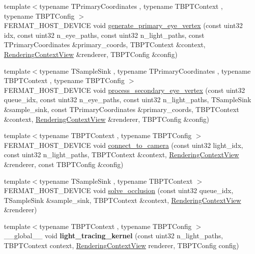\begin{DoxyCompactItemize}
\item 
{\footnotesize template$<$typename T\+Primary\+Coordinates , typename T\+B\+P\+T\+Context , typename T\+B\+P\+T\+Config $>$ }\\F\+E\+R\+M\+A\+T\+\_\+\+H\+O\+S\+T\+\_\+\+D\+E\+V\+I\+CE void \hyperlink{group___b_p_t_lib_core_gad13a8364b017ae28c4732ffd7eab9a65}{generate\+\_\+primary\+\_\+eye\+\_\+vertex} (const uint32 idx, const uint32 n\+\_\+eye\+\_\+paths, const uint32 n\+\_\+light\+\_\+paths, const T\+Primary\+Coordinates \&primary\+\_\+coords, T\+B\+P\+T\+Context \&context, \hyperlink{struct_rendering_context_view}{Rendering\+Context\+View} \&renderer, T\+B\+P\+T\+Config \&config)
\item 
{\footnotesize template$<$typename T\+Sample\+Sink , typename T\+Primary\+Coordinates , typename T\+B\+P\+T\+Context , typename T\+B\+P\+T\+Config $>$ }\\F\+E\+R\+M\+A\+T\+\_\+\+H\+O\+S\+T\+\_\+\+D\+E\+V\+I\+CE void \hyperlink{group___b_p_t_lib_core_ga560956a804364f64f0cf35d2d0c07124}{process\+\_\+secondary\+\_\+eye\+\_\+vertex} (const uint32 queue\+\_\+idx, const uint32 n\+\_\+eye\+\_\+paths, const uint32 n\+\_\+light\+\_\+paths, T\+Sample\+Sink \&sample\+\_\+sink, const T\+Primary\+Coordinates \&primary\+\_\+coords, T\+B\+P\+T\+Context \&context, \hyperlink{struct_rendering_context_view}{Rendering\+Context\+View} \&renderer, T\+B\+P\+T\+Config \&config)
\item 
{\footnotesize template$<$typename T\+B\+P\+T\+Context , typename T\+B\+P\+T\+Config $>$ }\\F\+E\+R\+M\+A\+T\+\_\+\+H\+O\+S\+T\+\_\+\+D\+E\+V\+I\+CE void \hyperlink{group___b_p_t_lib_core_gaf85f457b11ee79f45371b8afe928cabe}{connect\+\_\+to\+\_\+camera} (const uint32 light\+\_\+idx, const uint32 n\+\_\+light\+\_\+paths, T\+B\+P\+T\+Context \&context, \hyperlink{struct_rendering_context_view}{Rendering\+Context\+View} \&renderer, const T\+B\+P\+T\+Config \&config)
\item 
{\footnotesize template$<$typename T\+Sample\+Sink , typename T\+B\+P\+T\+Context $>$ }\\F\+E\+R\+M\+A\+T\+\_\+\+H\+O\+S\+T\+\_\+\+D\+E\+V\+I\+CE void \hyperlink{group___b_p_t_lib_core_ga588188b86e2afbe1f62d1bdd7a145cbf}{solve\+\_\+occlusion} (const uint32 queue\+\_\+idx, T\+Sample\+Sink \&sample\+\_\+sink, T\+B\+P\+T\+Context \&context, \hyperlink{struct_rendering_context_view}{Rendering\+Context\+View} \&renderer)
\item 
{\footnotesize template$<$typename T\+B\+P\+T\+Context , typename T\+B\+P\+T\+Config $>$ }\\\+\_\+\+\_\+global\+\_\+\+\_\+ void {\bfseries light\+\_\+tracing\+\_\+kernel} (const uint32 n\+\_\+light\+\_\+paths, T\+B\+P\+T\+Context context, \hyperlink{struct_rendering_context_view}{Rendering\+Context\+View} renderer, T\+B\+P\+T\+Config config)

\end{DoxyCompactItemize}
